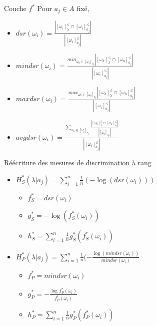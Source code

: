 \documentclass[usenames,dvipsnames]{beamer}
\newcommand{\myfrac}[2]{\frac{\displaystyle {#1}}{\displaystyle {#2}}}
\begin{document}
\begin{frame}{Couche $f^*$}
    Pour $a_j \in A$ fixé,
    \begin{itemize}
        \item $dsr(\omega_i) = \myfrac{| [\omega_i]^{\leq}_{\lambda} \cap [\omega_i]^{\leq}_{a_j}|}{| [\omega_i]^{\leq}_{a_j} |}$
        \item $mindsr(\omega_i) = \myfrac{min_{\omega_h \in [\omega_i]_{a_j}} |[\omega_h]^{\leq}_{\lambda} \cap [\omega_h]^{\leq}_{a_j}|}{| [\omega_i]^{\leq}_{a_j} |}$
        \item $maxdsr(\omega_i) = \myfrac{max_{\omega_h \in [\omega_i]_{a_j}} |[\omega_h]^{\leq}_{\lambda} \cap [\omega_h]^{\leq}_{a_j}|}{| [\omega_i]^{\leq}_{a_j} |}$
        \item $avgdsr(\omega_i) = \myfrac{\displaystyle\sum_{\omega_h \in [\omega_i]_{a_j}} \myfrac{|[\omega_h]^{\leq}_{\lambda} \cap [\omega_h]^{\leq}_{a_j}|}{|[\omega_i]_{a_j}|}}{| [\omega_i]^{\leq}_{a_j} |}$
    \end{itemize}
\end{frame}

\begin{frame}{Réécriture des mesures de discrimination à rang}
    \begin{itemize}
        \item $H^*_S(\lambda|a_j) = \displaystyle\sum_{i=1}^{n}\myfrac{1}{n} (-\log(dsr(\omega_i)))$
        \begin{itemize}
            \item $f^*_S = dsr(\omega_i)$
            \item $g^*_S = -\log(f^*_S(\omega_i))$
            \item $h^*_S = \sum_{i=1}^{n} \myfrac{1}{n} g^*_S(f^*_S(\omega_i))$
        \end{itemize}
    \item $H^*_P(\lambda|a_j) = \displaystyle\sum_{i=1}^{n}\myfrac{1}{n} (-\myfrac{\log(mindsr(\omega_i))}{mindsr(\omega_i)}$
        \begin{itemize}
            \item $f^*_P = mindsr(\omega_i)$
            \item $g^*_P = -\myfrac{\log f^*_P(\omega_i)}{f^*_P(\omega_i)}$
            \item $h^*_P = \sum_{i=1}^{n} \myfrac{1}{n} g^*_P(f^*_P(\omega_i))$
        \end{itemize}
    \end{itemize}
\end{frame}
\end{document}
